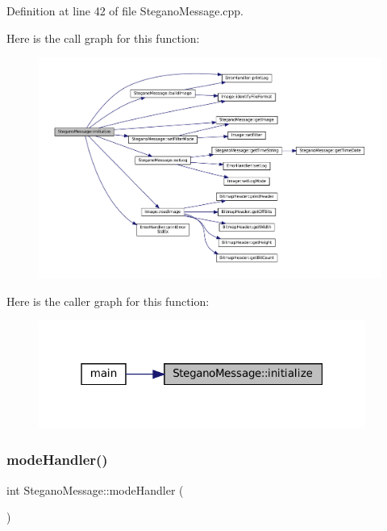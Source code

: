 Definition at line 42 of file Stegano\+Message.\+cpp.

Here is the call graph for this function\+:\nopagebreak
\begin{figure}[H]
\begin{center}
\leavevmode
\includegraphics[width=350pt]{classSteganoMessage_aeb4d2b69498c148508e2ca70194679cc_cgraph}
\end{center}
\end{figure}
Here is the caller graph for this function\+:\nopagebreak
\begin{figure}[H]
\begin{center}
\leavevmode
\includegraphics[width=304pt]{classSteganoMessage_aeb4d2b69498c148508e2ca70194679cc_icgraph}
\end{center}
\end{figure}
\mbox{\label{classSteganoMessage_a2649e515941e730520b759282d00dcd6}} 
\subsubsection{\texorpdfstring{modeHandler()}{modeHandler()}}
{\footnotesize\ttfamily int Stegano\+Message\+::mode\+Handler (\begin{DoxyParamCaption}{ }\end{DoxyParamCaption})}



